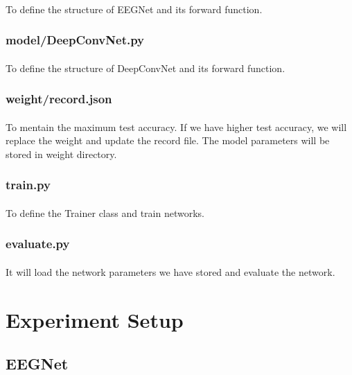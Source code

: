 \paragraph{}
To define the structure of EEGNet and its forward function. 
\subsubsection{model/DeepConvNet.py}
\paragraph{}
To define the structure of DeepConvNet and its forward function.
\subsubsection{weight/record.json}
\paragraph{}
To mentain the maximum test accuracy. If we have higher test accuracy, we will replace the weight and update the record file. The model parameters will be stored in weight directory.
\subsubsection{train.py}
\paragraph{}
To define the Trainer class and train networks.
\subsubsection{evaluate.py}
\paragraph{}
It will load the network parameters we have stored and evaluate the network.
\section{Experiment Setup}
\subsection{EEGNet}
